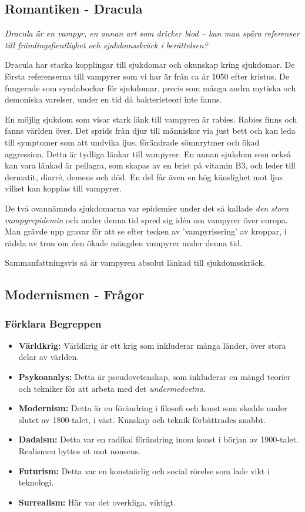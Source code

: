 \subsection{Romantiken - Dracula}

\textit{Dracula är en vampyr, en annan art som dricker blod – kan man spåra referenser till främlingsfientlighet och sjukdomsskräck i berättelsen?} \bigskip

Dracula har starka kopplingar till sjukdomar och okunskap kring sjukdomar. De första referenserna till vampyrer som vi har är från ca år 1050 efter kristus. De fungerade som syndabockar för sjukdomar, precis som många andra mytiska och demoniska varelser, under en tid då bakterieteori inte fanns.

En möjlig sjukdom som visar stark länk till vampyren är rabies. Rabies finns och fanns världen över. Det sprids från djur till människor via just bett och kan leda till symptomer som att undvika ljus, förändrade sömnrytmer och ökad aggression. Detta är tydliga länkar till vampyrer. En annan sjukdom som också kan vara länkad är pellagra, som skapas av en brist på vitamin B3, och leder till dermatit, diarré, demens och död. En del får även en hög känslighet mot ljus vilket kan kopplas till vampyrer.

De två ovannämnda sjukdomarna var epidemier under det så kallade \textit{den stora vampyrepidemin} och under denna tid spred sig idén om vampyrer över europa. Man grävde upp gravar för att se efter tecken av 'vampyrisering' av kroppar, i rädsla av tron om den ökade mängden vampyrer under denna tid.

Sammanfattningsvis så är vampyren absolut länkad till sjukdomsskräck.

\newpage
\subsection{Modernismen - Frågor}

\subsubsection{Förklara Begreppen}
\begin{itemize}
	\item \textbf{Världkrig:} Världkrig är ett krig som inkluderar många länder, över stora delar av världen.
	\item \textbf{Psykoanalys:} Detta är pseudovetenskap, som inkluderar en mängd teorier och tekniker för att arbeta med det \textit{undermedvetna}.
	\item \textbf{Modernism:} Detta är en förändring i filosofi och konst som skedde under slutet av 1800-talet, i väst. Kunskap och teknik förbättrades snabbt. 
	\item \textbf{Dadaism:} Detta var en radikal förändring inom konst i början av 1900-talet. Realismen byttes ut mot nonsens.
	\item \textbf{Futurism:} Detta var en konstnärlig och social rörelse som lade vikt i teknologi.
	\item \textbf{Surrealism:} Här var det overkliga, viktigt.
\end{itemize}

